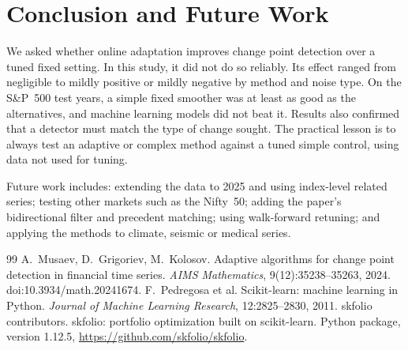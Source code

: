 \documentclass[12pt,a4paper]{report}
\theoremstyle{definition}\newtheorem{definition}{Definition}[chapter]
\begin{document}
\chapter{Conclusion and Future Work}
We asked whether online adaptation improves change point detection over a tuned fixed setting. In this study, it did not do so reliably. Its effect ranged from negligible to mildly positive or mildly negative by method and noise type. On the S\&P~500 test years, a simple fixed smoother was at least as good as the alternatives, and machine learning models did not beat it. Results also confirmed that a detector must match the type of change sought. The practical lesson is to always test an adaptive or complex method against a tuned simple control, using data not used for tuning.

Future work includes: extending the data to 2025 and using index-level related series; testing other markets such as the Nifty~50; adding the paper's bidirectional filter and precedent matching; using walk-forward retuning; and applying the methods to climate, seismic or medical series.

\begin{thebibliography}{99}\small
{} A.~Musaev, D.~Grigoriev, M.~Kolosov. Adaptive algorithms for change point detection in financial time series. \emph{AIMS Mathematics}, 9(12):35238--35263, 2024. doi:10.3934/math.20241674.
 F.~Pedregosa et al. Scikit-learn: machine learning in Python. \emph{Journal of Machine Learning Research}, 12:2825--2830, 2011.
 skfolio contributors. skfolio: portfolio optimization built on scikit-learn. Python package, version 1.12.5, \url{https://github.com/skfolio/skfolio}.
\end{thebibliography}
\end{document}
